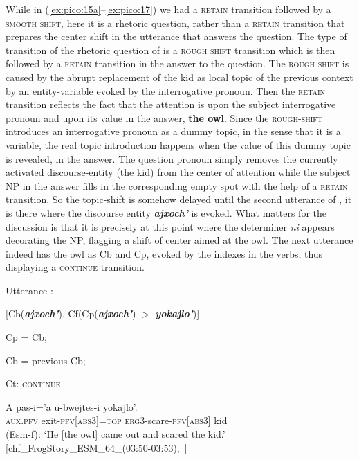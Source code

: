 \documentclass[output=paper
,modfonts
,nonflat]{langsci/langscibook}
\begin{document}
While in (\ref{ex:pico:15a}--\ref{ex:pico:17}) we had a \textsc{retain} transition followed by a \textsc{smooth shift}, here it is a rhetoric question, rather than a \textsc{retain} transition that prepares the center shift in the utterance that answers the question. The type of transition of the rhetoric question of  is a \textsc{rough shift} transition which is then followed by a \textsc{retain} transition in the answer to the question. The \textsc{rough shift} is caused by the abrupt replacement of the kid as local topic of the previous context by an entity-variable evoked by the interrogative pronoun. Then the \textsc{retain} transition reflects the fact that the attention is upon the subject interrogative pronoun and upon its value in the answer, \textbf{the owl}. Since the \textsc{rough-shift} introduces an interrogative pronoun as a dummy topic, in the sense that it is a variable, the real topic introduction happens when the value of this dummy topic is revealed, in the answer. The question pronoun simply removes the currently activated discourse-entity (the kid) from the center of attention while the subject NP in the answer fills in the corresponding empty spot with the help of a \textsc{retain} transition.  So the topic-shift is somehow delayed until the second utterance of , it is there where the discourse entity \textbf{\textit{ajxoch'}} is evoked. What matters for the discussion is that it is precisely at this point where the determiner \textit{ni} appears decorating the NP, flagging a shift of center aimed at the owl. The next utterance  indeed has the owl as Cb and Cp, evoked by the indexes in the verbs, thus displaying a \textsc{continue} transition.

\ea
Utterance :

[Cb(\textbf{\textit{ajxoch'}}), Cf(Cp(\textit{\textbf{ajxoch'}}) $>$ \textbf{\textit{yokajlo'}})]

Cp = Cb;

Cb = previous Cb; 

Ct: \textsc{continue}
\z

\ea \label{ex:pico:27}

\gll A pas-i='a u-bwejtes-i yokajlo'.\\
\textsc{aux.pfv} exit-\textsc{pfv[abs3]}=\textsc{top} \textsc{erg3}-scare-\textsc{pfv[abs3]} {kid}\\
\glt (Esm-f): `He [the owl] came out and scared the kid.' [chf\_FrogStory\_ESM\_64\_(03:50-03:53),~\citealt{Delgado-Galvan2018archive}]
\end{document}
